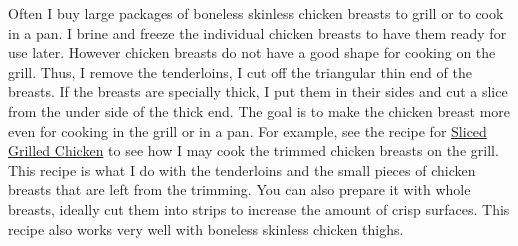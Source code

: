\documentclass[11pt,letterpaper]{article}
\begin{document}


Often I buy large packages of boneless skinless chicken breasts to grill or to cook in a pan. I brine and freeze the individual chicken breasts to have them ready for use later. However chicken breasts do not have a good shape for cooking on the grill. Thus, I remove the tenderloins, I cut off the triangular thin end of the breasts. If the breasts are specially thick, I put them in their sides and cut a slice from the under side of the thick end. The goal is to make the chicken breast more even for cooking in the grill or in a pan. For example, see the recipe for \href{SlicedGrilledChicken.html}{Sliced Grilled Chicken} to see how I may cook the trimmed chicken breasts on the grill. This recipe is what I do with the tenderloins and the small pieces of chicken breasts that are left from the trimming. You can also prepare it with whole breasts, ideally cut them into strips to increase the amount of crisp surfaces. This recipe also works very well with boneless skinless chicken thighs.
\end{document}
